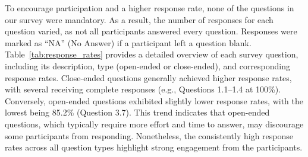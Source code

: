 To encourage participation and a higher response rate, none of the questions in our survey were mandatory. As a result, the number of responses for each question varied, as not all participants answered every question. Responses were marked as ``NA'' (No Answer) if a participant left a question blank.
Table~\ref{tab:response_rates} provides a detailed overview of each survey question, including its description, type (open-ended or close-ended), and corresponding response rates. Close-ended questions generally achieved higher response rates, with several receiving complete responses (e.g., Questions 1.1–1.4 at 100\%). Conversely, open-ended questions exhibited slightly lower response rates, with the lowest being 85.2\% (Question 3.7). This trend indicates that open-ended questions, which typically require more effort and time to answer, may discourage some participants from responding. Nonetheless, the consistently high response rates across all question types highlight strong engagement from the participants.

